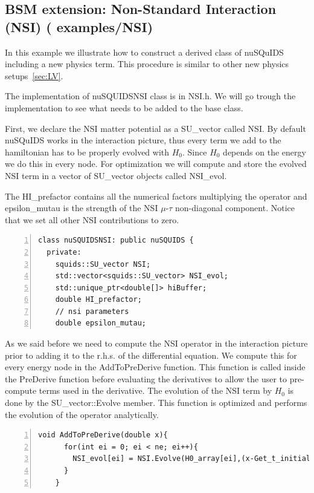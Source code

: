 \documentclass[3p,12pt]{elsarticle}
\newcommand{\ttf}{\ttfamily}
\begin{document}
\subsection{BSM extension: Non-Standard  Interaction (NSI) \textnormal{({\ttf
      examples/NSI})}}
\label{sec:NSI}
In this example we illustrate how to construct a derived class of
nuSQuIDS including a new physics term. This procedure is similar to
other new physics setups~\ref{sec:LV}.

The implementation of {\ttf nuSQUIDSNSI} class is in {\ttf NSI.h}.
We will go trough the implementation to see what needs to be
added to the base class.

First, we declare the NSI matter potential as a {\ttf SU\_vector}
called {\ttf NSI}. By default nuSQuIDS  works in the interaction
picture, thus every term we add to the hamiltonian has to be properly
evolved with $H_0$. Since $H_0$ depends on the energy we do this in
every node. For optimization we will compute and store the evolved NSI
term in a vector of {\ttf SU\_vector} objects called {\ttf NSI\_evol}.

The {\ttf HI\_prefactor} contains all the numerical factors multiplying the
operator and {\ttf epsilon\_mutau} is the strength of the NSI $\mu$-$\tau$ 
non-diagonal component. Notice that we set all other NSI
contributions to zero.

\begin{lstlisting}[frame=leftline, numbers =
  left,breaklines=true,label = ex:sin1]
class nuSQUIDSNSI: public nuSQUIDS {
  private:
    squids::SU_vector NSI;
    std::vector<squids::SU_vector> NSI_evol;
    std::unique_ptr<double[]> hiBuffer;
    double HI_prefactor;
    // nsi parameters
    double epsilon_mutau;

\end{lstlisting}

As we said before we need to compute the NSI operator in the
interaction picture prior to adding it to the r.h.s. of the
differential equation. We compute this for every energy node in the
{\ttf AddToPreDerive} function. This function is called inside the
{\ttf PreDerive} function before evaluating the derivatives to allow
the user to pre-compute terms used in the derivative.
The evolution of the NSI term by $H_0$ is done by the {\ttf
  SU\_vector::Evolve} member. This function is optimized and performs
the evolution of the operator analytically.

\begin{lstlisting}[frame=leftline, numbers =
  left,breaklines=true,label = ex:sin1,firstnumber=last]
    void AddToPreDerive(double x){
      for(int ei = 0; ei < ne; ei++){
        NSI_evol[ei] = NSI.Evolve(H0_array[ei],(x-Get_t_initial()));
      }
    }
\end{lstlisting}
\end{document}
